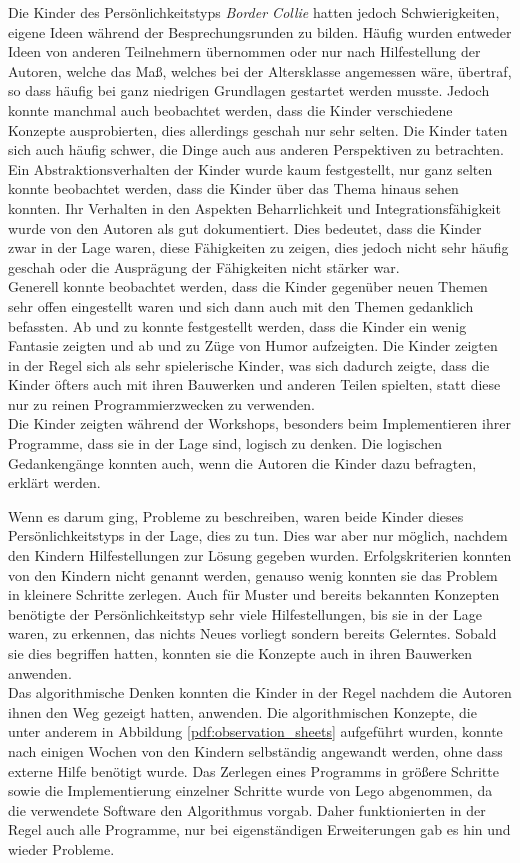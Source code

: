 		
		Die Kinder des Persönlichkeitstyps \textit{Border Collie} hatten jedoch Schwierigkeiten, eigene Ideen während der Besprechungsrunden zu bilden. Häufig wurden entweder Ideen von anderen Teilnehmern übernommen oder nur nach Hilfestellung der Autoren, welche das Maß, welches bei der Altersklasse angemessen wäre, übertraf, so dass häufig bei ganz niedrigen Grundlagen gestartet werden musste. Jedoch konnte manchmal auch beobachtet werden, dass die Kinder verschiedene Konzepte ausprobierten, dies allerdings geschah nur sehr selten. Die Kinder taten sich auch häufig schwer, die Dinge auch aus anderen Perspektiven zu betrachten.\\
		Ein Abstraktionsverhalten der Kinder wurde kaum festgestellt, nur ganz selten konnte beobachtet werden, dass die Kinder über das Thema hinaus sehen konnten. Ihr Verhalten in den Aspekten Beharrlichkeit und Integrationsfähigkeit wurde von den Autoren als gut dokumentiert. Dies bedeutet, dass die Kinder zwar in der Lage waren, diese Fähigkeiten zu zeigen, dies jedoch nicht sehr häufig geschah oder die Ausprägung der Fähigkeiten nicht stärker war.\\
		Generell konnte beobachtet werden, dass die Kinder gegenüber neuen Themen sehr offen eingestellt waren und sich dann auch mit den Themen gedanklich befassten. Ab und zu konnte festgestellt werden, dass die Kinder ein wenig Fantasie zeigten und ab und zu Züge von Humor aufzeigten. Die Kinder zeigten in der Regel sich als sehr spielerische Kinder, was sich dadurch zeigte, dass die Kinder öfters auch mit ihren Bauwerken und anderen Teilen spielten, statt diese nur zu reinen Programmierzwecken zu verwenden.\\
		Die Kinder zeigten während der Workshops, besonders beim Implementieren ihrer Programme, dass sie in der Lage sind, logisch zu denken. Die logischen Gedankengänge konnten auch, wenn die Autoren die Kinder dazu befragten, erklärt werden.
		
		
		Wenn es darum ging, Probleme zu beschreiben, waren beide Kinder dieses Persönlichkeitstyps in der Lage, dies zu tun. Dies war aber nur möglich, nachdem den Kindern Hilfestellungen zur Lösung gegeben wurden. Erfolgskriterien konnten von den Kindern nicht genannt werden, genauso wenig konnten sie das Problem in kleinere Schritte zerlegen. Auch für Muster und bereits bekannten Konzepten benötigte der Persönlichkeitstyp sehr viele Hilfestellungen, bis sie in der Lage waren, zu erkennen, das nichts Neues vorliegt sondern bereits Gelerntes. Sobald sie dies begriffen hatten, konnten sie die Konzepte auch in ihren Bauwerken anwenden.\\
		Das algorithmische Denken konnten die Kinder in der Regel nachdem die Autoren ihnen den Weg gezeigt hatten, anwenden. Die algorithmischen Konzepte, die unter anderem in Abbildung \ref{pdf:observation_sheets} aufgeführt wurden, konnte nach einigen Wochen von den Kindern selbständig angewandt werden, ohne dass externe Hilfe benötigt wurde. Das Zerlegen eines Programms in größere Schritte sowie die Implementierung einzelner Schritte wurde von Lego abgenommen, da die verwendete Software den Algorithmus vorgab. Daher funktionierten in der Regel auch alle Programme, nur bei eigenständigen Erweiterungen gab es hin und wieder Probleme.
		
